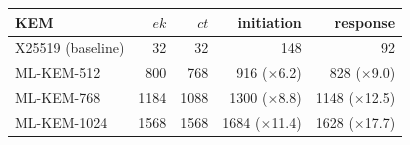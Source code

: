 \begin{tabular}{@{}lrrrr@{}}
\toprule
KEM & $ek$ & $ct$ & initiation & response \\
\midrule
X25519 (baseline) & 32 & 32 & 148 & 92 \\
\midrule
ML-KEM-512 & 800 & 768 & 916 ($\times$6.2) & 828 ($\times$9.0) \\
ML-KEM-768 & 1184 & 1088 & 1300 ($\times$8.8) & 1148 ($\times$12.5) \\
ML-KEM-1024 & 1568 & 1568 & 1684 ($\times$11.4) & 1628 ($\times$17.7) \\
\bottomrule
\end{tabular}
